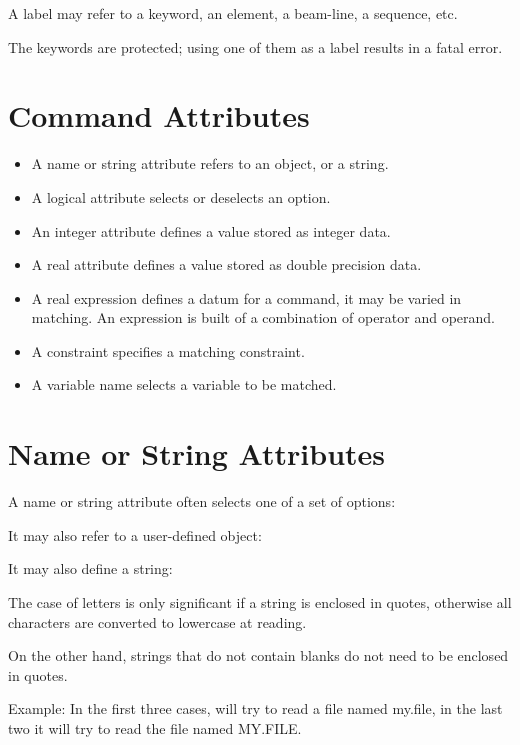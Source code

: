 A label may refer to a keyword, an element, a beam-line, a sequence,
etc.   

The \madx keywords are protected; using one of them as a label
results in a fatal error.  


%
\section{Command Attributes}
\label{sec:attribute}

\begin{itemize}
  \item A name or string attribute refers to an object, or a string. 
  \item A logical attribute selects or deselects an option. 
  \item An integer attribute defines a value stored as integer data.
  \item A real attribute defines a value stored as double precision data.  
  \item A real expression defines a datum for a command, it may be
    varied in matching. An expression is built of a combination of
    operator and operand. 
  \item A constraint specifies a matching constraint. 
  \item A variable name selects a variable to be matched. 
\end{itemize}


%
\section{Name or String Attributes}
\label{sec:name}\label{sec:string}
A name or string attribute often selects one of a set of options: 

It may also refer to a user-defined object: 

It may also define a string: 

The case of letters is only significant if a string is enclosed in
quotes, otherwise all characters are converted to lowercase at
reading. 

On the other hand, strings that do not contain blanks do not
need to be enclosed in quotes.

Example:
In the first three cases, \madx will try to read a file named my.file, in the
last two it will try to read the file named MY.FILE.  


